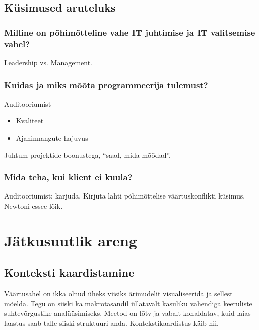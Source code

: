 \documentclass{tufte-book}
\begin{document}
\section{Küsimused aruteluks}
\subsection{Milline on põhimõtteline vahe IT juhtimise ja IT valitsemise vahel?}
Leadership vs. Management.

\subsection{Kuidas ja miks mõõta programmeerija tulemust?}
Auditooriumist
\begin{itemize}
	\item Kvaliteet
	\item Ajahinnangute hajuvus
\end{itemize}

Juhtum projektide boonustega, \enquote{saad, mida mõõdad}.

\subsection{Mida teha, kui klient ei kuula?}
Auditooriumist: karjuda. Kirjuta lahti põhimõttelise väärtuskonflikti küsimus. Newtoni essee lõik. 

\chapter{Jätkusuutlik areng}
\section{Konteksti kaardistamine}
Väärtusahel on ikka olnud üheks viisiks ärimudelit visualiseerida ja sellest mõelda. Tegu on siiski ka makrotasandil üllatavalt kasuliku vahendiga keeruliste suhtevõrgustike analüüsimiseks. Meetod on lõtv ja vabalt kohaldatav, kuid laias laastus saab talle siiski struktuuri anda. Kontekstikaardistus käib nii. 
\end{document}
